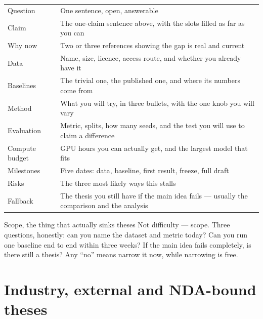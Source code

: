 \documentclass[11pt,a4paper]{article}
\begin{document}
\begin{center}
\small
\begin{tabularx}{0.97\textwidth}{L{3.6cm} X}
\toprule
{} &  \\
\midrule
{} Question & One sentence, open, answerable \\
Claim & The one-claim sentence above, with the slots filled as far as you can \\
 Why now & Two or three references showing the gap is real
and current \\
Data & Name, size, licence, access route, and whether you already have it \\
 Baselines & The trivial one, the published one, and where
its numbers come from \\
Method & What you will try, in three bullets, with the one knob you will vary \\
 Evaluation & Metric, splits, how many seeds, and the test
you will use to claim a difference \\
Compute budget & GPU hours you can actually get, and the largest model that
fits \\
 Milestones & Five dates: data, baseline, first result,
freeze, full draft \\
Risks & The three most likely ways this stalls \\
 Fallback & The thesis you still have if the main idea fails
--- usually the comparison and the analysis \\
\bottomrule
\end{tabularx}
\end{center}

\begin{wbox}{Scope, the thing that actually sinks theses}
Not difficulty --- scope. Three questions, honestly: can you name the dataset
and metric today? Can you run one baseline end to end within three weeks? If
the main idea fails completely, is there still a thesis? Any ``no'' means
narrow it now, while narrowing is free.
\end{wbox}

\section{Industry, external and NDA-bound theses}
\label{sec:industry}
\end{document}
